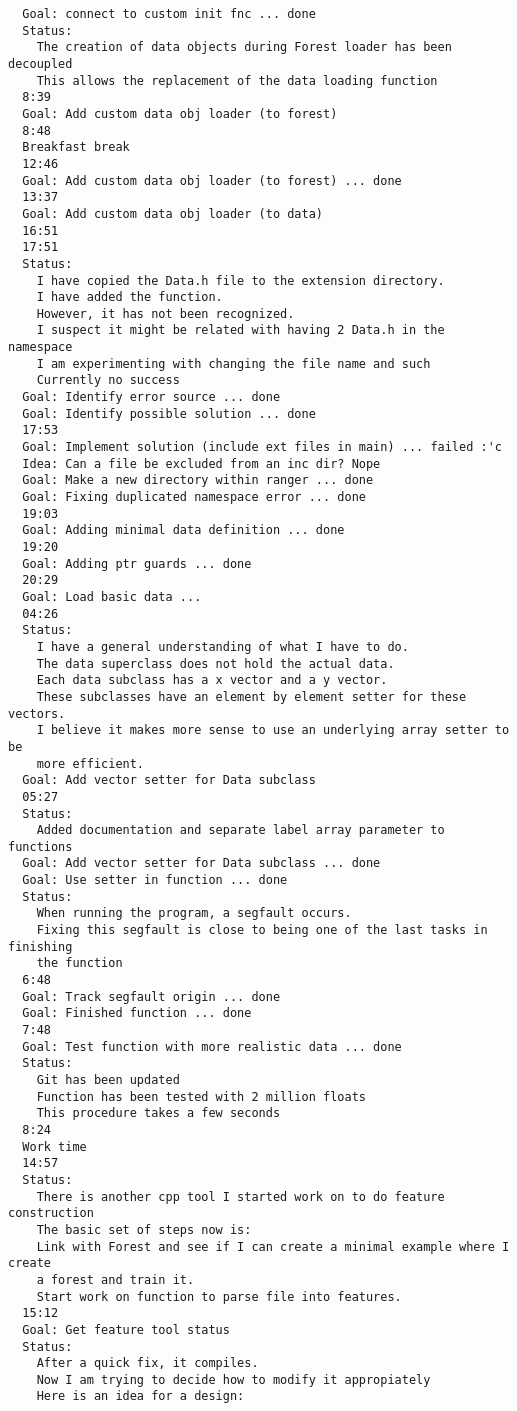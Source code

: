 \documentclass[12pt,oneside]{book}
\begin{document}
\begin{lstlisting}
  Goal: connect to custom init fnc ... done
  Status:
    The creation of data objects during Forest loader has been decoupled
    This allows the replacement of the data loading function
  8:39
  Goal: Add custom data obj loader (to forest)
  8:48
  Breakfast break
  12:46
  Goal: Add custom data obj loader (to forest) ... done
  13:37
  Goal: Add custom data obj loader (to data)
  16:51
  17:51
  Status:
    I have copied the Data.h file to the extension directory.
    I have added the function.
    However, it has not been recognized.
    I suspect it might be related with having 2 Data.h in the namespace
    I am experimenting with changing the file name and such
    Currently no success
  Goal: Identify error source ... done
  Goal: Identify possible solution ... done
  17:53
  Goal: Implement solution (include ext files in main) ... failed :'c
  Idea: Can a file be excluded from an inc dir? Nope
  Goal: Make a new directory within ranger ... done
  Goal: Fixing duplicated namespace error ... done
  19:03
  Goal: Adding minimal data definition ... done
  19:20
  Goal: Adding ptr guards ... done
  20:29
  Goal: Load basic data ... 
  04:26
  Status:
    I have a general understanding of what I have to do.
    The data superclass does not hold the actual data.
    Each data subclass has a x vector and a y vector.
    These subclasses have an element by element setter for these vectors.
    I believe it makes more sense to use an underlying array setter to be
    more efficient.
  Goal: Add vector setter for Data subclass
  05:27
  Status:
    Added documentation and separate label array parameter to functions
  Goal: Add vector setter for Data subclass ... done
  Goal: Use setter in function ... done
  Status:
    When running the program, a segfault occurs.
    Fixing this segfault is close to being one of the last tasks in finishing
    the function
  6:48
  Goal: Track segfault origin ... done
  Goal: Finished function ... done
  7:48
  Goal: Test function with more realistic data ... done
  Status:
    Git has been updated
    Function has been tested with 2 million floats
    This procedure takes a few seconds
  8:24
  Work time
  14:57
  Status:
    There is another cpp tool I started work on to do feature construction
    The basic set of steps now is:
    Link with Forest and see if I can create a minimal example where I create
    a forest and train it.
    Start work on function to parse file into features.
  15:12
  Goal: Get feature tool status
  Status:
    After a quick fix, it compiles.
    Now I am trying to decide how to modify it appropiately
    Here is an idea for a design:


\end{lstlisting}
\end{document}

